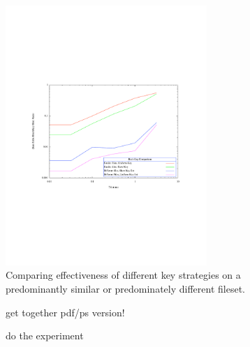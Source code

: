 \documentclass[10pt, twocolumn]{article}
\begin{document}
 \begin{figure}[h] 
 \centering
\includegraphics[width= 3in]{ratioSimDiff.pdf}
\caption{Comparing effectiveness of different key strategies on a predominantly similar or predominately different fileset.}
\label{simdiff} 
\end{figure}   

 \begin{figure}[h] 
 \centering
\caption{}
\label{performanceTest}
\end{figure}   

 \begin{figure}[h] 
 \centering
\caption{get together pdf/ps version!}
\label{headerFiles}
\end{figure}  

 \begin{figure}[h] 
 \centering
\caption{do the experiment}
\label{appendData}
\end{figure}  

\end{document}
